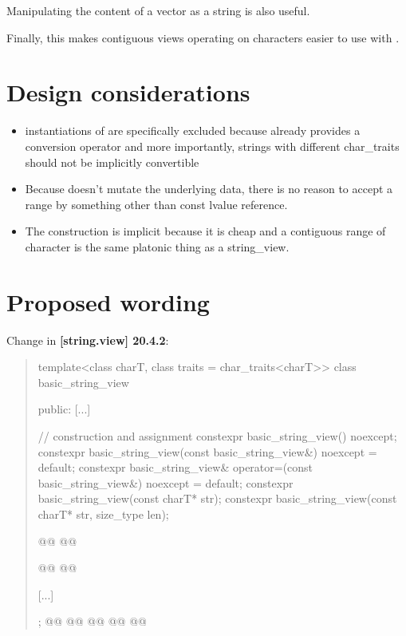 \documentclass{wg21}
\begin{document}
Manipulating the content of a vector as a string is also useful.

Finally, this makes contiguous views operating on characters easier to use with .


\section{Design considerations}

\begin{itemize}
    \item instantiations of  are specifically excluded because  already provides a conversion operator and more importantly,
    strings with different char_traits should not be implicitly convertible
    \item Because  doesn't mutate the underlying data, there is no reason to accept a range by something other than const lvalue reference.
    \item The construction is implicit because it is cheap and a contiguous range of character is the same platonic thing as a string_view.

\end{itemize}

\section{Proposed wording}

Change in \textbf{[string.view] 20.4.2}:
\begin{quote}
\begin{codeblock}

template<class charT, class traits = char_traits<charT>>
class basic_string_view {
public:
    [...]

    // construction and assignment
    constexpr basic_string_view() noexcept;
    constexpr basic_string_view(const basic_string_view&) noexcept = default;
    constexpr basic_string_view& operator=(const basic_string_view&) noexcept = default;
    constexpr basic_string_view(const charT* str);
    constexpr basic_string_view(const charT* str, size_type len);

    @@
    @@

    @@
    @@

    [...]
};
@@
@@
@@
@@
@@

\end{codeblock}
\end{quote}
\end{document}
